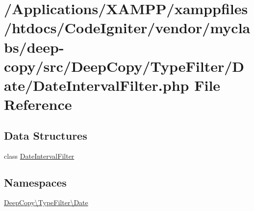 \hypertarget{_date_interval_filter_8php}{}\section{/\+Applications/\+X\+A\+M\+P\+P/xamppfiles/htdocs/\+Code\+Igniter/vendor/myclabs/deep-\/copy/src/\+Deep\+Copy/\+Type\+Filter/\+Date/\+Date\+Interval\+Filter.php File Reference}
\label{_date_interval_filter_8php}
\subsection*{Data Structures}
\begin{DoxyCompactItemize}
\item 
class \mbox{\hyperlink{class_deep_copy_1_1_type_filter_1_1_date_1_1_date_interval_filter}{Date\+Interval\+Filter}}
\end{DoxyCompactItemize}
\subsection*{Namespaces}
\begin{DoxyCompactItemize}
\item 
 \mbox{\hyperlink{namespace_deep_copy_1_1_type_filter_1_1_date}{Deep\+Copy\textbackslash{}\+Type\+Filter\textbackslash{}\+Date}}
\end{DoxyCompactItemize}
